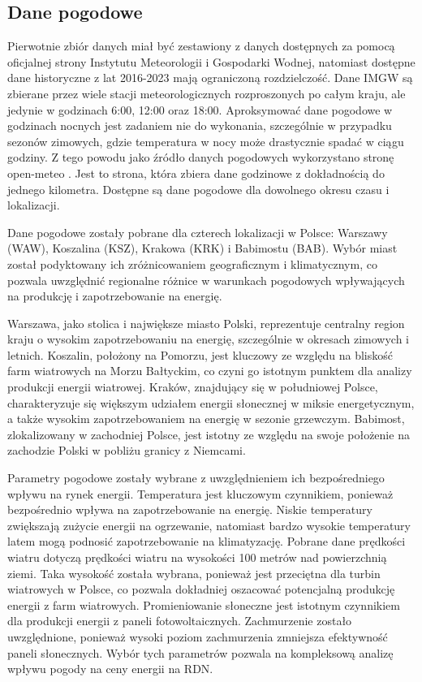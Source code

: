 \subsection{Dane pogodowe}
Pierwotnie zbiór danych miał być zestawiony z danych dostępnych za pomocą oficjalnej strony Instytutu Meteorologii i Gospodarki Wodnej, natomiast dostępne dane historyczne z lat 2016-2023 mają ograniczoną rozdzielczość. Dane IMGW są zbierane przez wiele stacji meteorologicznych rozproszonych po całym kraju, ale jedynie w godzinach 6:00, 12:00 oraz 18:00. Aproksymować dane pogodowe w godzinach nocnych jest zadaniem nie do wykonania, szczególnie w przypadku sezonów zimowych, gdzie temperatura w nocy może drastycznie spadać w ciągu godziny. Z tego powodu jako źródło danych pogodowych wykorzystano stronę open-meteo \cite{METEO}. Jest to strona, która zbiera dane godzinowe z dokładnością do jednego kilometra. Dostępne są dane pogodowe dla dowolnego okresu czasu i lokalizacji.

Dane pogodowe zostały pobrane dla czterech lokalizacji w Polsce: Warszawy (WAW), Koszalina (KSZ), Krakowa (KRK) i Babimostu (BAB). Wybór miast został podyktowany ich zróżnicowaniem geograficznym i klimatycznym, co pozwala uwzględnić regionalne różnice w warunkach pogodowych wpływających na produkcję i zapotrzebowanie na energię. 

Warszawa, jako stolica i największe miasto Polski, reprezentuje centralny region kraju o wysokim zapotrzebowaniu na energię, szczególnie w okresach zimowych i letnich. Koszalin, położony na Pomorzu, jest kluczowy ze względu na bliskość farm wiatrowych na Morzu Bałtyckim, co czyni go istotnym punktem dla analizy produkcji energii wiatrowej. Kraków, znajdujący się w południowej Polsce, charakteryzuje się większym udziałem energii słonecznej w miksie energetycznym, a także wysokim zapotrzebowaniem na energię w sezonie grzewczym. Babimost, zlokalizowany w zachodniej Polsce, jest istotny ze względu na swoje położenie na zachodzie Polski w pobliżu granicy z Niemcami.

Parametry pogodowe zostały wybrane z uwzględnieniem ich bezpośredniego wpływu na rynek energii.\newline
Temperatura jest kluczowym czynnikiem, ponieważ bezpośrednio wpływa na zapotrzebowanie na energię. Niskie temperatury zwiększają zużycie energii na ogrzewanie, natomiast bardzo wysokie temperatury latem mogą podnosić zapotrzebowanie na klimatyzację.\newline
Pobrane dane prędkości wiatru dotyczą prędkości wiatru na wysokości 100 metrów nad powierzchnią ziemi. Taka wysokość została wybrana, ponieważ jest przeciętna dla turbin wiatrowych w Polsce, co pozwala dokładniej oszacować potencjalną produkcję energii z farm wiatrowych.\newline
Promieniowanie słoneczne jest istotnym czynnikiem dla produkcji energii z paneli fotowoltaicznych.\newline
Zachmurzenie zostało uwzględnione, ponieważ wysoki poziom zachmurzenia zmniejsza efektywność paneli słonecznych. 
Wybór tych parametrów pozwala na kompleksową analizę wpływu pogody na ceny energii na RDN.

